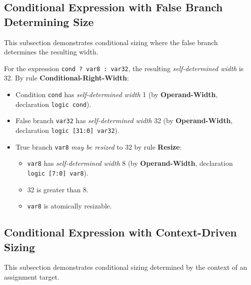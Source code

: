 \documentclass{article}
\newcommand{\sv}[1]{{\color{black}\texttt{#1}}}
\newcommand{\sds}{\emph{self-determined width}}
\newcommand{\mbr}{\emph{may be resized}}
\begin{document}
{\subsection{Conditional Expression with False Branch Determining Size}

This subsection demonstrates conditional sizing where the false
branch determines the resulting width.

For the expression \sv{cond ? var8 : var32}, the resulting \sds{} is
32. By rule \textbf{Conditional-Right-Width}:
\begin{itemize}
  \item Condition \sv{cond} has \sds{} 1 (by
    \textbf{Operand-Width}, declaration \sv{logic cond}).
  \item False branch \sv{var32} has \sds{} 32 (by
    \textbf{Operand-Width}, declaration \sv{logic [31:0] var32}).
  \item True branch \sv{var8} \mbr{} to 32 by rule \textbf{Resize}:
    \begin{itemize}
      \item \sv{var8} has \sds{} 8 (by
        \textbf{Operand-Width}, declaration \sv{logic [7:0] var8}).
      \item 32 is greater than 8.
      \item \sv{var8} is atomically resizable.
    \end{itemize}
\end{itemize}

\subsection{Conditional Expression with Context-Driven Sizing}

This subsection demonstrates conditional sizing determined by the
context of an assignment target.

}
\end{document}
